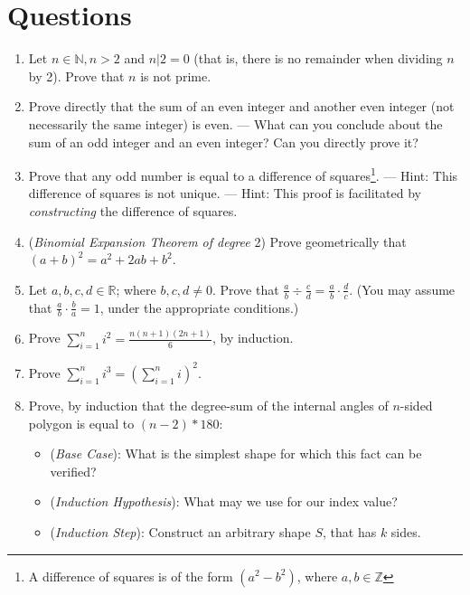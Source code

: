 \documentclass[../proofs.tex]{subfiles}
\begin{document}
\chapter{Questions}
	\begin{enumerate}
		\item Let $n \in \mathbb{N}, n > 2$ and $n | 2 = 0$ (that is, there is no remainder when dividing $n$ by 2). Prove that $n$ is not prime.
		\item Prove directly that the sum of an even integer and another even integer (not necessarily the same integer) is even.
			\subitem --- What can you conclude about the sum of an odd integer and an even integer? Can you directly prove it?
		\item \challenge Prove that any odd number is equal to a difference of squares\footnote{A difference of squares is of the form $(a^2 - b^2)$, where $a, b \in \mathbb{Z}$}.
			\subitem --- Hint: This difference of squares is not unique.
			\subitem --- Hint: This proof is facilitated by \emph{constructing} the difference of squares.
		\item (\emph{Binomial Expansion Theorem of degree} 2) Prove geometrically that $(a+b)^2 = a^2 + 2ab + b^2$.
		\item Let $a, b, c, d \in \mathbb{R}$; where $b, c, d \neq 0$. Prove that $\frac{a}{b} \div \frac{c}{d} = \frac{a}{b} \cdot \frac{d}{c}$. (You may assume that $\frac{a}{b} \cdot \frac{b}{a} = 1$, under the appropriate conditions.)
		\item Prove $\sum_{i = 1}^{n} i^2 = \frac{n(n+1)(2n+1)}{6}$, by induction.
		\item Prove $\sum_{i = 1}^{n} i^3 = (\sum_{i = 1}^{n} i)^2 $.
		\item \challenge Prove, by induction that the degree-sum of the internal angles of $n$-sided polygon is equal to $(n-2)*180$:
			\begin{itemize}
				\item (\emph{Base Case}): What is the simplest shape for which this fact can be verified?
				\item (\emph{Induction Hypothesis}): What may we use for our index value?
				\item (\emph{Induction Step}): Construct an arbitrary shape $S$, that has $k$ sides.
			\end{itemize}


\end{enumerate}
\end{document}

